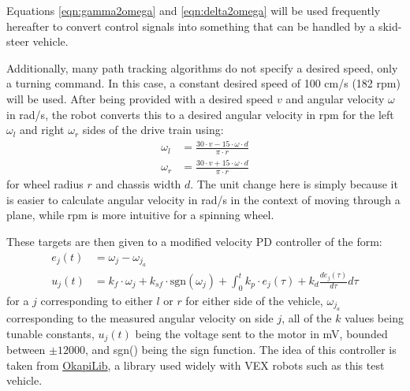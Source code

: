 \documentclass[mla7]{mla}
\begin{document}
\begin{paper}
Equations \ref{eqn:gamma2omega} and \ref{eqn:delta2omega} will be used frequently hereafter to convert control signals into something that can be handled by a skid-steer vehicle. 

Additionally, many path tracking algorithms do not specify a desired speed, only a turning command. In this case, a constant desired speed of 100 cm/s (182 rpm) will be used. After being provided with a desired speed $v$ and angular velocity $\omega$ in rad/s, the robot converts this to a desired angular velocity in rpm for the left $\omega_l$ and right $\omega_r$ sides of the drive train using:
\begin{subequations}
\begin{align}
\omega_l&= \frac{30 \cdot v - 15 \cdot \omega \cdot d}{\pi \cdot r} \\
\omega_r&= \frac{30 \cdot v + 15 \cdot \omega \cdot d}{\pi \cdot r}
\end{align}
\end{subequations}
for wheel radius $r$ and chassis width $d$. The unit change here is simply because it is easier to calculate angular velocity in rad/s in the context of moving through a plane, while rpm is more intuitive for a spinning wheel.

These targets are then given to a modified velocity PD controller of the form:
\begin{subequations}
\begin{align}
e_j(t) &= \omega_j - \omega_{j_a} \\
u_j(t) &= k_f \cdot \omega_j + k_{sf} \cdot \text{sgn}(\omega_j) + \int_0^t \! k_p \cdot e_j(\tau) + k_d \frac{de_j(\tau)}{d\tau} d\tau
\end{align}
\end{subequations}
for a $j$ corresponding to either $l$ or $r$ for either side of the vehicle, $\omega_{j_a}$ corresponding to the measured angular velocity on side $j$, all of the $k$ values being tunable constants, $u_j(t)$ being the voltage sent to the motor in mV, bounded between $\pm12000$, and sgn() being the sign function. The idea of this controller is taken from \href{https://github.com/OkapiLib/OkapiLib}{OkapiLib}, a library used widely with VEX robots such as this test vehicle. 


\end{paper}
\end{document}
